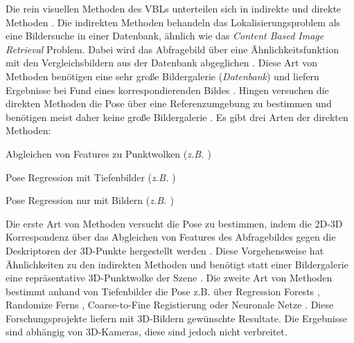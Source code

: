 Die rein visuellen Methoden des VBLs unterteilen sich in indirekte und direkte Methoden \cite{lowryVisualPlaceRecognition2016}. Die indirekten Methoden behandeln das Lokalisierungsproblem als eine Bildersuche in einer Datenbank, ähnlich wie das \textit{Content Based Image Retrieval} \cite{lewContentbasedMultimediaInformation2006} Problem. Dabei wird das Abfragebild über eine Ähnlichkeitsfunktion mit den Vergleichsbildern aus der Datenbank abgeglichen \cite{zhangImageBasedLocalization2006, arandjelovicThreeThingsEveryone2012, radenovicCNNImageRetrieval2016}. Diese Art von Methoden benötigen eine sehr große Bildergalerie (\textit{Datenbank}) und liefern Ergebnisse bei Fund eines korrespondierenden Bildes \cite{lowryVisualPlaceRecognition2016}. Hingen versuchen die direkten Methoden die Pose über eine Referenzumgebung zu bestimmen und benötigen meist daher keine große Bildergalerie  \cite{piascoSurveyVisualBasedLocalization2018}. Es gibt drei Arten der direkten Methoden: 
\begin{enumerate*}[label=\arabic*)]
	\item Abgleichen von Features zu Punktwolken (\textit{z.B. \cite{liWorldwidePoseEstimation2012}})
	\item Pose Regression mit Tiefenbilder (\textit{z.B. \cite{shottonSceneCoordinateRegression2013a}})
	\item Pose Regression nur mit Bildern (\textit{z.B. \cite{kendallPoseNetConvolutionalNetwork2015}})
\end{enumerate*}

Die erste Art von Methoden versucht die Pose zu bestimmen, indem die 2D-3D Korrespondenz über das Abgleichen von Features des Abfragebildes gegen die Deskriptoren der 3D-Punkte hergestellt werden \cite{irscharaStructurefrommotionPointClouds2009, liWorldwidePoseEstimation2012, svarmCityScaleLocalizationCameras2017}. Diese Vorgehensweise hat Ähnlichkeiten zu den indirekten Methoden und benötigt statt einer Bildergalerie eine repräsentative 3D-Punktwolke der Szene \cite{piascoSurveyVisualBasedLocalization2018}. Die zweite Art von Methoden bestimmt anhand von Tiefenbilder die Pose z.B. über Regression Forests \cite{shottonSceneCoordinateRegression2013a}, Randomize Ferns \cite{glockerRealTimeRGBDCamera2015}, Coarse-to-Fine Registierung \cite{santosMappingIndoorSpaces2016} oder Neuronale Netze \cite{massicetiRandomForestsNeural2016}. Diese Forschungsprojekte liefern mit 3D-Bildern gewünschte Resultate. Die Ergebnisse sind abhängig von 3D-Kameras, diese sind jedoch nicht verbreitet.

